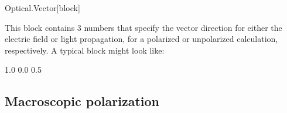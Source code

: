 \begin{fdfentry}{Optical.Vector}[block]
  
  This block contains 3 numbers that specify the vector direction for
  either the electric field or light propagation, for a polarized or
  unpolarized calculation, respectively. A typical block might look
  like:
  \begin{fdfexample}
        1.0 0.0 0.5
  \end{fdfexample}

\end{fdfentry}




\subsection{Macroscopic polarization}
\label{sec:macroscopic-polarization}

